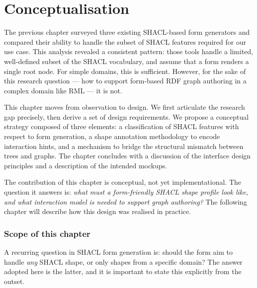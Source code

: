 
\chapter{Conceptualisation}
\label{chap:conceptualisation}

The previous chapter surveyed three existing SHACL-based form generators and compared their ability to handle the subset of SHACL features required for our use case. This analysis revealed a consistent pattern: those tools handle a limited, well-defined subset of the SHACL vocabulary, and assume that a form renders a single root node. For simple domains, this is sufficient. However, for the sake of this research question --- how to support form-based RDF graph authoring in a complex domain like RML --- it is not.

This chapter moves from observation to design. We first articulate the research gap precisely, then derive a set of design requirements. We propose a conceptual strategy composed of three elements: a classification of SHACL features with respect to form generation, a shape annotation methodology to encode interaction hints, and a mechanism to bridge the structural mismatch between trees and graphs. The chapter concludes with a discussion of the interface design principles and a description of the intended mockups.

The contribution of this chapter is conceptual, not yet implementational. The question it answers is: \emph{what must a form-friendly SHACL shape profile look like, and what interaction model is needed to support graph authoring?} The following chapter will describe how this design was realised in practice.

\subsection{Scope of this chapter}
\label{sec:scope}

A recurring question in SHACL form generation is: should the form aim to handle \emph{any} SHACL shape, or only shapes from a specific domain?
The answer adopted here is the latter, and it is important to state this explicitly from the outset.

